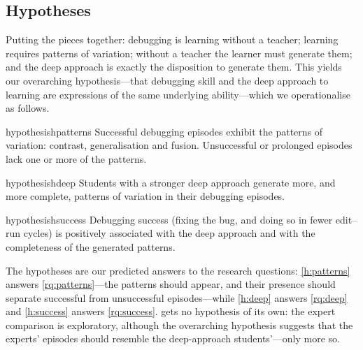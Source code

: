 
\subsection{Hypotheses}
\label{hypotheses}

Putting the pieces together: debugging is learning without a teacher; learning
requires patterns of variation; without a teacher the learner must generate
them; and the deep approach is exactly the disposition to generate them.
This yields our overarching hypothesis---that debugging skill and the deep
approach to learning are expressions of the same underlying ability---which
we operationalise as follows.

\begin{frame}
  \begin{restatable}{hypothesis}{hpatterns}\label{h:patterns}
    Successful debugging episodes exhibit the patterns of variation:
    contrast, generalisation and fusion.
    Unsuccessful or prolonged episodes lack one or more of the patterns.
  \end{restatable}
  \begin{restatable}{hypothesis}{hdeep}\label{h:deep}
    Students with a stronger deep approach generate more, and more
    complete, patterns of variation in their debugging episodes.
  \end{restatable}
  \begin{restatable}{hypothesis}{hsuccess}\label{h:success}
    Debugging success (fixing the bug, and doing so in fewer edit--run
    cycles) is positively associated with the deep approach and with the
    completeness of the generated patterns.
  \end{restatable}
\end{frame}

The hypotheses are our predicted answers to the research questions:
\cref{h:patterns} answers \cref{rq:patterns}---the patterns should appear,
and their presence should separate successful from unsuccessful
episodes---while \cref{h:deep} answers \cref{rq:deep} and \cref{h:success}
answers \cref{rq:success}.
 gets no hypothesis of its own: the expert comparison is
exploratory, although the overarching hypothesis suggests that the experts'
episodes should resemble the deep-approach students'---only more so.

